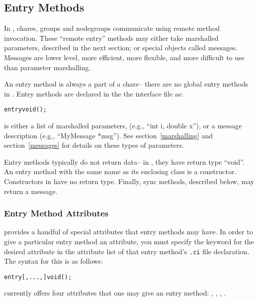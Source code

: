 \subsection{Entry Methods}
\label{entry}

In \charmpp, chares, groups and 
nodegroups communicate using remote method invocation.  These ``remote entry'' methods may either take marshalled parameters, described in the next section; or special objects called messages.  Messages are lower level, more efficient, more flexible, and more difficult to use than parameter marshalling.

An entry method is always a part of a chare--
there are no global entry methods in \charmpp{}.
Entry methods are declared in the the interface file as:

\begin{alltt}
entry void ();
\end{alltt}

 is either a list of marshalled parameters,
(e.g., ``int i, double x''), or a message description (e.g.,
``MyMessage *msg'').  See section~\ref{marshalling} and
section~\ref{messages} for details on these types of
parameters.

Entry methods typically do not return data-- in \CC, they have
return type ``void''.  An entry method with the same name
as its enclosing class is a constructor.  Constructors in \CC
have no return type.  Finally, sync methods, described below,
may return a message.

\subsubsection{Entry Method Attributes}
\label{attributes}

\charmpp{}  provides a handful of special attributes that entry methods may have.  In order to give a particular entry method an attribute, you must specify the keyword for the desired
attribute in the attribute list of that entry method's {\tt .ci} file
declaration.  The syntax for this is as follows:

\begin{alltt}
entry [, ..., ] void ();
\end{alltt}

\charmpp{} currently offers four attributes that one may give an entry method:
, , , .

